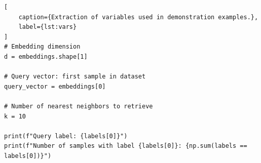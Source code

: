 \begin{lstlisting}[
    caption={Extraction of variables used in demonstration examples.},
    label={lst:vars}
]
# Embedding dimension
d = embeddings.shape[1]

# Query vector: first sample in dataset
query_vector = embeddings[0]

# Number of nearest neighbors to retrieve
k = 10

print(f"Query label: {labels[0]}")
print(f"Number of samples with label {labels[0]}: {np.sum(labels == labels[0])}")
\end{lstlisting}